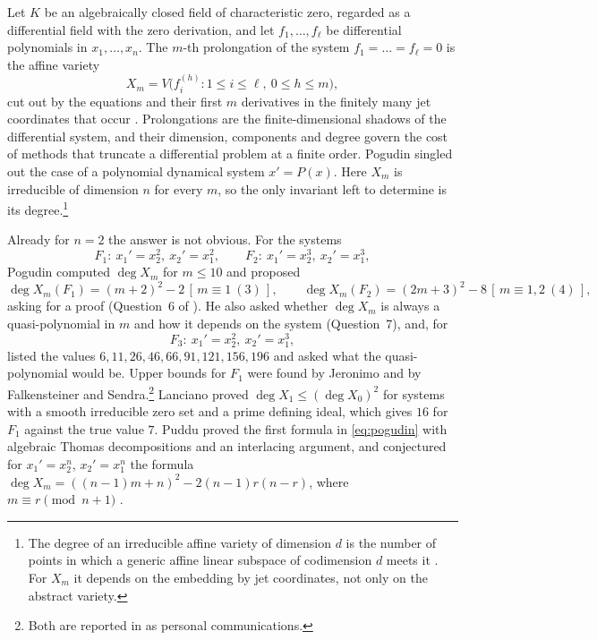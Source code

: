 \documentclass[11pt]{amsart}
\theoremstyle{definition}
\theoremstyle{remark}
\numberwithin{equation}{section}
\newcommand{\ind}[1]{[\,#1\,]}
\begin{document}
Let $K$ be an algebraically closed field of characteristic zero, regarded as a differential field with the zero derivation, and let $f_1,\dots,f_\ell$ be differential polynomials in $x_1,\dots,x_n$. The $m$-th prolongation of the system $f_1=\dots=f_\ell=0$ is the affine variety
\[
X_m=V\bigl(f_i^{(h)}:1\le i\le\ell,\ 0\le h\le m\bigr),
\]
cut out by the equations and their first $m$ derivatives in the finitely many jet coordinates that occur \cite{Ritt,Pog25}. Prolongations are the finite-dimensional shadows of the differential system, and their dimension, components and degree govern the cost of methods that truncate a differential problem at a finite order. Pogudin \cite[Section~2]{Pog25} singled out the case of a polynomial dynamical system $x'=P(x)$. Here $X_m$ is irreducible of dimension $n$ for every $m$, so the only invariant left to determine is its degree.\footnote{The degree of an irreducible affine variety of dimension $d$ is the number of points in which a generic affine linear subspace of codimension $d$ meets it \cite[Lecture~18]{Har92}. For $X_m$ it depends on the embedding by jet coordinates, not only on the abstract variety.}

Already for $n=2$ the answer is not obvious. For the systems
\[
F_1:\ x_1'=x_2^2,\ x_2'=x_1^2,\qquad F_2:\ x_1'=x_2^3,\ x_2'=x_1^3,
\]
Pogudin computed $\deg X_m$ for $m\le10$ and proposed
\begin{equation}\label{eq:pogudin}
\deg X_m(F_1)=(m+2)^2-2\,\ind{m\equiv1\ (3)},\qquad
\deg X_m(F_2)=(2m+3)^2-8\,\ind{m\equiv1,2\ (4)},
\end{equation}
asking for a proof (Question~6 of \cite{Pog25}). He also asked whether $\deg X_m$ is always a quasi-polynomial in $m$ and how it depends on the system (Question~7), and, for
\[
F_3:\ x_1'=x_2^2,\ x_2'=x_1^3,
\]
listed the values $6,11,26,46,66,91,121,156,196$ and asked what the quasi-polynomial would be. Upper bounds for $F_1$ were found by Jeronimo and by Falkensteiner and Sendra.\footnote{Both are reported in \cite[Section~2]{Pog25} as personal communications.} Lanciano \cite{Lan26} proved $\deg X_1\le(\deg X_0)^2$ for systems with a smooth irreducible zero set and a prime defining ideal, which gives $16$ for $F_1$ against the true value $7$. Puddu \cite{Pud26} proved the first formula in \eqref{eq:pogudin} with algebraic Thomas decompositions and an interlacing argument, and conjectured for $x_1'=x_2^n$, $x_2'=x_1^n$ the formula $\deg X_m=((n-1)m+n)^2-2(n-1)r(n-r)$, where $m\equiv r\pmod{n+1}$ \cite[Conjecture~4.1]{Pud26}.
\end{document}
